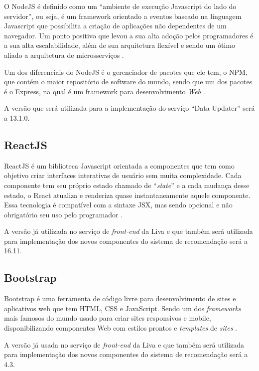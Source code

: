O NodeJS é definido como um “ambiente de execução Javascript do lado do servidor”, ou seja, é um framework orientado a eventos baseado na linguagem Javascript que possibilita a criação de aplicações não dependentes de um navegador. Um ponto positivo que levou a sua alta adoção pelos programadores é a sua alta escalabilidade, além de sua arquitetura flexível e sendo um ótimo aliado a arquitetura de microsserviços \cite{nodejs:2019}.

Um dos diferenciais do NodeJS é o gerenciador de pacotes que ele tem, o NPM, que contém o maior repositório de software do mundo, sendo que um dos pacotes é o Express, na qual é um framework para desenvolvimento \textit{Web} \cite{lenon:2018}.

A versão que será utilizada para a implementação do serviço “Data Updater” será a 13.1.0.

\subsection{ReactJS}

ReactJS é um biblioteca Javascript orientada a componentes que tem como objetivo criar interfaces interativas de usuário sem muita complexidade. Cada componente tem seu próprio estado chamado de “\textit{state}” e a cada mudança desse estado, o React atualiza e renderiza quase instantaneamente aquele componente. Essa tecnologia é compatível com a sintaxe JSX, mas sendo opcional e não obrigatório seu uso pelo programador \cite{reactjs:2019}.

A versão já utilizada no serviço de \textit{front-end} da Liva e que também será utilizada para implementação dos novos componentes do sistema de recomendação será a 16.11.

\subsection{Bootstrap}

Bootstrap é uma ferramenta de código livre para desenvolvimento de sites e aplicativos web que tem HTML, CSS e JavaScript. Sendo um dos \textit{frameworks} mais famosos do mundo usado para criar sites responsivos e mobile, disponibilizando componentes Web com estilos prontos e \textit{templates} de \textit{sites} \cite{bootstrap:2019}.

A versão já usada no serviço de \textit{front-end} da Liva e que também será utilizada para implementação dos novos componentes do sistema de recomendação será a 4.3.

